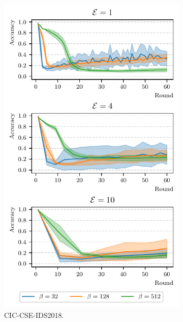 \begin{figure}[t]
  \centering
  \begin{subfigure}{.49\linewidth}
    \centering
    \includegraphics[width=\linewidth]{figures/cicids/hyperparams-late}
    \caption{
      CIC-CSE-IDS2018.
      \label{fig:assess.hyperparams-late.cicids}
    }
  \end{subfigure}
  \hfill
  \begin{subfigure}{.49\linewidth}
    \centering

\end{subfigure}
\end{figure}
